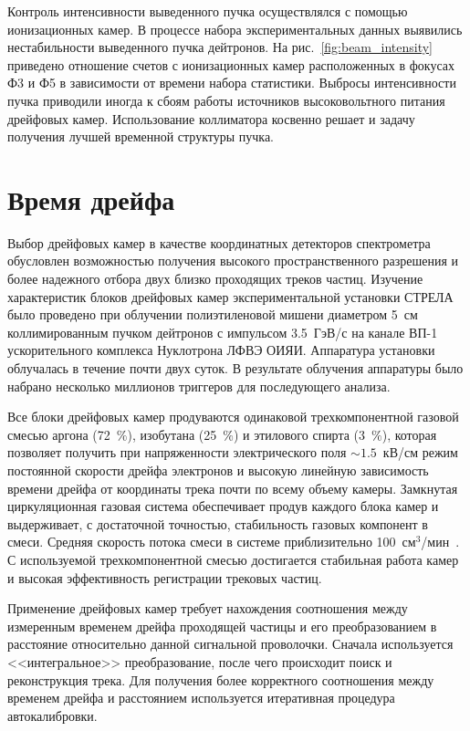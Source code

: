 Контроль интенсивности выведенного пучка осуществлялся с помощью ионизационных
камер. В процессе набора экспериментальных данных выявились нестабильности
выведенного пучка дейтронов. На рис.~\ref{fig:beam_intensity} приведено
отношение счетов с ионизационных камер расположенных в фокусах Ф3 и Ф5 в
зависимости от времени набора статистики. Выбросы интенсивности пучка приводили
иногда к сбоям работы источников высоковольтного питания дрейфовых
камер. Использование коллиматора косвенно решает и задачу получения лучшей
временной структуры пучка.

\section{Время дрейфа}
Выбор дрейфовых камер в качестве координатных детекторов спектрометра обусловлен
возможностью получения высокого пространственного разрешения и более надежного
отбора двух близко проходящих треков частиц. Изучение характеристик блоков
дрейфовых камер экспериментальной установки СТРЕЛА было проведено при облучении
полиэтиленовой мишени диаметром 5~см коллимированным пучком дейтронов с
импульсом 3.5~ГэВ/с на канале ВП-1 ускорительного комплекса Нуклотрона ЛФВЭ
ОИЯИ. Аппаратура установки облучалась в течение почти двух суток. В результате
облучения аппаратуры было набрано несколько миллионов триггеров для последующего
анализа.

Все блоки дрейфовых камер продуваются одинаковой трехкомпонентной газовой смесью
аргона (72~$\%$), изобутана (25~$\%$) и этилового спирта (3~$\%$), которая
позволяет получить при напряженности электрического поля $\sim 1.5$~кВ/см режим
постоянной скорости дрейфа электронов и высокую линейную зависимость времени
дрейфа от координаты трека почти по всему объему камеры. Замкнутая
циркуляционная газовая система обеспечивает продув каждого блока камер и
выдерживает, с достаточной точностью, стабильность газовых компонент в
смеси. Средняя скорость потока смеси в системе приблизительно
100~см$^{3}$/мин~\cite{filatova77}. С используемой трехкомпонентной смесью
достигается стабильная работа камер и высокая эффективность регистрации трековых
частиц.

Применение дрейфовых камер требует нахождения соотношения между измеренным
временем дрейфа проходящей частицы и его преобразованием в расстояние
относительно данной сигнальной проволочки. Сначала используется <<интегральное>>
преобразование, после чего происходит поиск и реконструкция трека. Для получения
более корректного соотношения между временем дрейфа и расстоянием используется
итеративная процедура автокалибровки.

